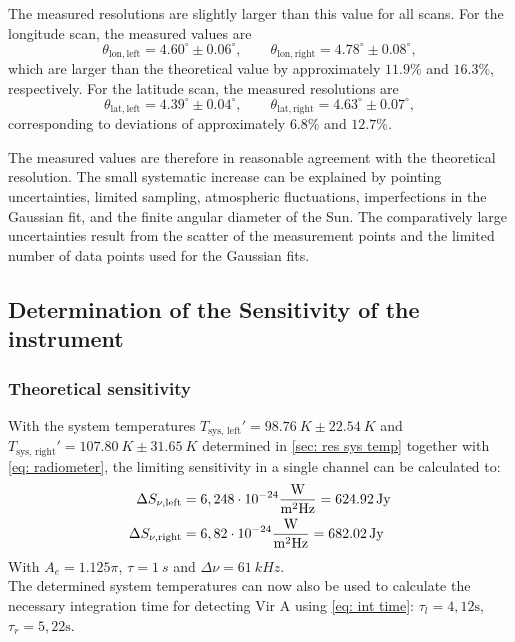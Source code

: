 \documentclass[10pt,a4paper, bibliography=totoc]{scrartcl}
\begin{document}
The measured resolutions are slightly larger than this value for all scans. For the longitude scan, the measured values are
\[
\theta_{\mathrm{lon,left}} = 4.60^\circ \pm 0.06^\circ,
\qquad
\theta_{\mathrm{lon,right}} = 4.78^\circ \pm 0.08^\circ,
\]
which are larger than the theoretical value by approximately $11.9\%$ and $16.3\%$, respectively. For the latitude scan, the measured resolutions are
\[
\theta_{\mathrm{lat,left}} = 4.39^\circ \pm 0.04^\circ,
\qquad
\theta_{\mathrm{lat,right}} = 4.63^\circ \pm 0.07^\circ,
\]
corresponding to deviations of approximately $6.8\%$ and $12.7\%$.

The measured values are therefore in reasonable agreement with the theoretical resolution. The small systematic increase can be explained by pointing uncertainties, limited sampling, atmospheric fluctuations, imperfections in the Gaussian fit, and the finite angular diameter of the Sun. The comparatively large uncertainties result from the scatter of the measurement points and the limited number of data points used for the Gaussian fits.

\subsection{Determination of the Sensitivity of the instrument}
\subsubsection{Theoretical sensitivity}
With the system temperatures $T_\text{sys, left}'=\qty{98.76}{K}\pm\qty{22.54}{K}$ and $T_\text{sys, right}'=\qty{107.80}{K}\pm\qty{31.65}{K}$ determined in \autoref{sec: res sys temp} together with \autoref{eq: radiometer}, the limiting sensitivity in a single channel can be calculated to:
\begin{align}
	\Delta S_{\nu,\text{left}} &= 6,248 \cdot 10^{-24} \frac{\text{W}}{\text{m}^2\text{Hz}} = 624.92 \text{\,Jy} \\
	\Delta S_{\nu,\text{right}} &= 6,82 \cdot 10^{-24} \frac{\text{W}}{\text{m}^2\text{Hz}} = 682.02 \text{\,Jy}
\end{align}
With $A_{e} = 1.125\pi$, $\tau = \qty{1}{s}$ and $\Delta \nu = \qty{61}{kHz}$.\\
The determined system temperatures can now also be used to calculate the necessary integration time for detecting Vir A using \autoref{eq: int time}: $\tau_{l} = 4,12\text{s}$, $\tau_{r} = 5,22\text{s}$.
\end{document}
